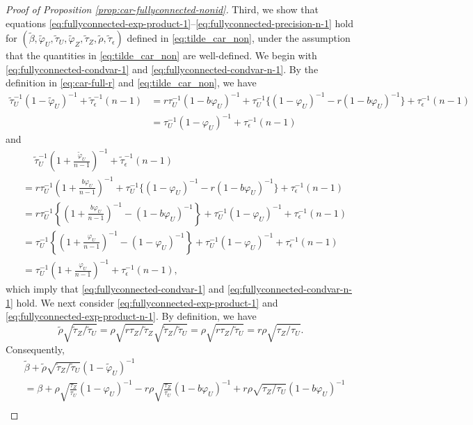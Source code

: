 \documentclass[10pt,a4paper]{amsart}
\begin{document}
\begin{proof}[Proof of Proposition \ref{prop:car-fullyconnected-nonid}]
Third, we show that equations \eqref{eq:fullyconnected-exp-product-1}--\eqref{eq:fullyconnected-precision-n-1} hold for $(\tilde\beta, \tilde\varphi_U, \tilde\tau_U, \tilde\varphi_Z, \tilde\tau_Z, \tilde\rho, \tilde\tau_\epsilon)$ defined in \eqref{eq:tilde_car_non}, under the assumption that the quantities in \eqref{eq:tilde_car_non} are well-defined. 
We begin with \eqref{eq:fullyconnected-condvar-1} and \eqref{eq:fullyconnected-condvar-n-1}. 
By the definition in \eqref{eq:car-full-r} and \eqref{eq:tilde_car_non}, we have 
\begin{align*}
\tilde\tau_U^{-1}(1-\tilde\varphi_U)^{-1} + \tilde\tau_\epsilon^{-1}(n-1) &= r \tau_U^{-1}(1-b\varphi_U)^{-1} + \tau_U^{-1}\{(1-\varphi_U)^{-1} - r(1-b\varphi_U)^{-1}\} + \tau_\epsilon^{-1}(n-1)
\\
&= \tau_U^{-1}(1-\varphi_U)^{-1} + \tau_\epsilon^{-1}(n-1)
\end{align*} and 
\begin{align*}
& \quad \ \tilde\tau_U^{-1}\left(1+\frac{\tilde\varphi_U}{n-1}\right)^{-1} + \tilde\tau_\epsilon^{-1}(n-1)
\\ 
&= r \tau_U^{-1}\left(1+\frac{b\varphi_U}{n-1}\right)^{-1} + \tau_U^{-1}\{(1-\varphi_U)^{-1} - r(1-b\varphi_U)^{-1}\} + \tau_\epsilon^{-1}(n-1) \\
&= r\tau_U^{-1}\left\{\left(1+\frac{b\varphi_U}{n-1}\right)^{-1} - (1-b\varphi_U)^{-1}\right\} + \tau_U^{-1}(1-\varphi_U)^{-1} + \tau_\epsilon^{-1}(n-1) \\
&= \tau_U^{-1}\left\{\left(1 + \frac{\varphi_U}{n-1} \right)^{-1} - \left(1-\varphi_U\right)^{-1}\right\}+ \tau_U^{-1}(1-\varphi_U)^{-1} + \tau_\epsilon^{-1}(n-1) \\
&= \tau_U^{-1}\left(1+\frac{\varphi_U}{n-1}\right)^{-1} + \tau_\epsilon^{-1} (n-1),
\end{align*} 
which imply that \eqref{eq:fullyconnected-condvar-1} and \eqref{eq:fullyconnected-condvar-n-1} hold. We next consider \eqref{eq:fullyconnected-exp-product-1} and \eqref{eq:fullyconnected-exp-product-n-1}. 
By definition, we have  \begin{equation}\nonumber%
\tilde\rho\sqrt{\tilde\tau_Z/\tilde\tau_U}=
 \rho\sqrt{r \tau_Z/\tilde\tau_Z} \sqrt{\tilde\tau_Z/\tilde\tau_U}
=
\rho\sqrt{r \tau_Z/\tilde\tau_U}
= 
r\rho\sqrt{\tau_Z/\tau_U}.
\end{equation} 
Consequently, 
\begin{align*}
&\tilde\beta + \tilde\rho\sqrt{\tilde\tau_Z/\tilde\tau_U}(1-\tilde\varphi_U)^{-1}\\ &=  \beta + \rho\sqrt{\frac{\tau_Z}{\tau_U}}(1-\varphi_U)^{-1} - r\rho\sqrt{\frac{\tau_Z}{\tau_U}}(1-b\varphi_U)^{-1} + r\rho\sqrt{\tau_Z/\tau_U}(1-b\varphi_U)^{-1} \\

\end{align*}
\end{proof}
\end{document}
